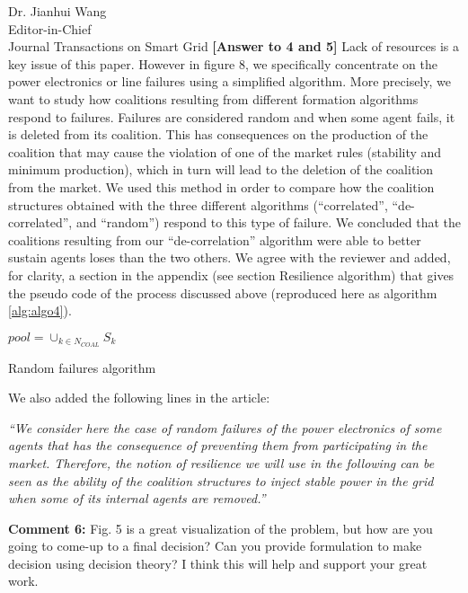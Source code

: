 \documentclass{letter}
\begin{document}
\begin{letter}{Dr. Jianhui Wang \\ Editor-in-Chief \\ Journal Transactions on Smart Grid }
\textbf{[Answer to 4 and 5]} Lack of resources is a key issue of this paper. However in figure 8, we specifically concentrate on the power electronics or line failures using a simplified algorithm. More precisely, we want to study how coalitions resulting from different formation algorithms respond to failures. Failures are considered random and when some agent fails, it is deleted from its coalition. This has consequences on the production of the coalition that may cause the violation of one of the market rules (stability and minimum production), which in turn will lead to the deletion of the coalition from the market. We used this method in order to compare how the coalition structures obtained with the three different algorithms (“correlated”, “de-correlated”, and “random”) respond to this type of failure. We concluded that the coalitions resulting from our “de-correlation” algorithm were able to better sustain agents loses than the two others. We agree with the reviewer and added, for clarity, a section in the appendix (see section Resilience algorithm) that gives the pseudo code of the process discussed above (reproduced here as algorithm \ref{alg:algo4}).

\begin{algorithm}
	
	$ pool = \cup_{k \in N_{COAL}} S_k $ \; 
	\caption{Random failures algorithm}
\label{alg:algo4}
\end{algorithm}

 We also added the following lines in the article: 

\textit{“We consider here the case of random failures of the power electronics of some agents that has the consequence of preventing them from participating in the market. Therefore, the notion of resilience we will use in the following can be seen as the ability of the coalition structures to inject stable power in the grid when some of its internal agents are removed.”}


\textbf{Comment 6:} Fig. 5 is a great visualization of the problem, but how are you going to come-up to a final decision? Can you provide formulation to make decision using decision theory? I think this will help and support your great work.



\end{letter}
\end{document}
